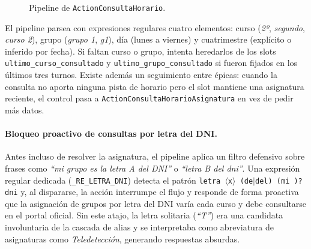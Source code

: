 \begin{figure}[hbtp]
\centering
{}
\caption{Pipeline de \texttt{ActionConsultaHorario}.}
\label{fig:pipe-horarios}
\end{figure}

El pipeline parsea con expresiones regulares cuatro elementos: curso (\textit{2º}, \textit{segundo}, \textit{curso 2}), grupo (\textit{grupo 1}, \textit{g1}), día (lunes a viernes) y cuatrimestre (explícito o inferido por fecha). Si faltan curso o grupo, intenta heredarlos de los slots \texttt{ultimo\_curso\_consultado} y \texttt{ultimo\_grupo\_consultado} si fueron fijados en los últimos tres turnos. Existe además un seguimiento entre épicas: cuando la consulta no aporta ninguna pista de horario pero el slot mantiene una asignatura reciente, el control pasa a \texttt{ActionConsultaHorarioAsignatura} en vez de pedir más datos.

\paragraph{Bloqueo proactivo de consultas por letra del DNI.} Antes incluso de resolver la asignatura, el pipeline aplica un filtro defensivo sobre frases como \textit{``mi grupo es la letra A del DNI''} o \textit{``letra B del dni''}. Una expresión regular dedicada (\texttt{\_RE\_LETRA\_DNI}) detecta el patrón \texttt{letra~$\langle$x$\rangle$~(de$\vert$del)~(mi~)?dni} y, al dispararse, la acción interrumpe el flujo y responde de forma proactiva que la asignación de grupos por letra del DNI varía cada curso y debe consultarse en el portal oficial. Sin este atajo, la letra solitaria (\textit{``T''}) era una candidata involuntaria de la cascada de alias y se interpretaba como abreviatura de asignaturas como \textit{Teledetección}, generando respuestas absurdas.

